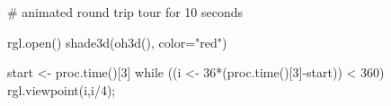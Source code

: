 \documentclass{article}
\begin{document}
\begin{SeeAlso}\relax
{}
\end{SeeAlso}
\begin{Examples}
\begin{ExampleCode}

# animated round trip tour for 10 seconds

rgl.open()
shade3d(oh3d(), color="red")

start <- proc.time()[3]
while ((i <- 36*(proc.time()[3]-start)) < 360) {
  rgl.viewpoint(i,i/4); 
}

\end{ExampleCode}
\end{Examples}
\end{document}
